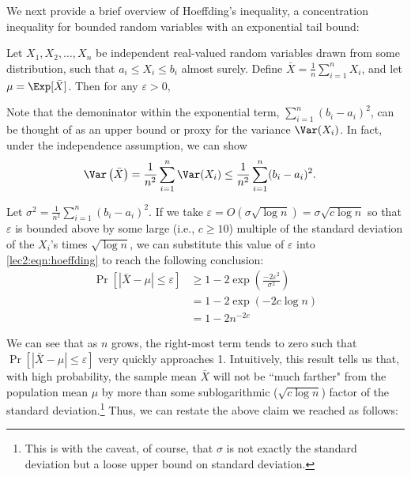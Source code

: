 \label{lec2:subsec:hoeffding}

We next provide a brief overview of Hoeffding's inequality, a concentration inequality for bounded random variables with an exponential tail bound:

\begin{theorem}
    Let $X_1, X_2, \dots, X_n$ be independent real-valued random variables drawn from some distribution, such that $a_i \leq X_i \leq b_i$ almost surely. Define $\bar{X} = \frac{1}{n}\sum_{i=1}^n X_i$, and let $\mu = \Exp [\bar{X}]$. Then for any $\varepsilon > 0$,
\end{theorem}

Note that the demoninator within the exponential term, $\sum_{i=1}^n (b_i - a_i)^2$, can be thought of as an upper bound or proxy for the variance $\Var(X_i)$. In fact, under the independence assumption, we can show
\begin{align}
    \Var\left(\bar{X} \right) &= \frac{1}{n^2}\sum_{i=1}^n \Var(X_i) \leq \frac{1}{n^2}\sum_{i=1}^n (b_i - a_i)^2.
\end{align}

Let $\sigma^2 = \frac{1}{n^2}\sum_{i=1}^n (b_i - a_i)^2$. If we take $\varepsilon = O(\sigma \sqrt{\log{n}}) = \sigma \sqrt{c \log n}$ so that $\varepsilon$ is bounded above by some large (i.e., $c \geq 10$) multiple of the standard deviation of the $X_i$'s times $\sqrt{\log{n}}$, we can substitute this value of $\varepsilon$ into \eqref{lec2:eqn:hoeffding} to reach the following conclusion: 
\begin{align}
    \Pr \left[ |\bar{X} - \mu| \leq \varepsilon \right] &\geq 1 - 2\exp\left(\frac{-2 \varepsilon^2}{\sigma^2}\right)\\
    &= 1 - 2 \exp(-2 c \log n)\\
    &= 1 - 2 n^{-2c}
\end{align}

We can see that as $n$ grows, the right-most term tends to zero such that $\Pr[|\bar{X} - \mu| \leq \varepsilon]$ very quickly approaches 1. Intuitively, this result tells us that, with high probability, the sample mean $\bar{X}$ will not be ``much farther" from the population mean $\mu$ by more than some sublogarithmic ($\sqrt{c \log n}$) factor of the standard deviation.\footnote{This is with the caveat, of course, that $\sigma$ is not exactly the standard deviation but a loose upper bound on standard deviation.} Thus, we can restate the above claim we reached as follows:

